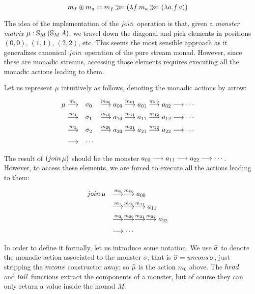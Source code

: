$$
m_f\circledast m_a = m_f \mathbin{\gg\!\!=} (\lambda f. m_a \mathbin{\gg\!\!=} (\lambda a. f\,a))
$$

The idea of the implementation of the $\join$ operation is that,
given a {\em monster matrix} $\mu:\mathbb{S}_{M}\,(\mathbb{S}_{M}\,A)$, we travel down the diagonal and pick elements in positions $(0,0)$, $(1,1)$, $(2,2)$, etc.
This seems the most sensible approach as it generalizes canonical $\join$ operation of the pure stream monad.
However, since these are monadic streams, accessing those elements requires executing all the monadic actions leading to them.

Let us represent $\mu$ intuitively as follows, denoting the monadic actions by arrow:

$$
\begin{array}[t]{rll}
\mu \stackrel{m_0}{\longrightarrow} 
 & \sigma_0 
 & \stackrel{m_{00}}{\longrightarrow} a_{00} \stackrel{m_{01}}{\longrightarrow} a_{01} \stackrel{m_{02}}{\longrightarrow} a_{02} \stackrel{}{\longrightarrow} \cdots\\[5pt]
\stackrel{m_1}{\longrightarrow} 
 & \sigma_1 
 & \stackrel{m_{10}}{\longrightarrow} a_{10} \stackrel{m_{11}}{\longrightarrow} a_{11} \stackrel{m_{12}}{\longrightarrow} a_{12} \stackrel{}{\longrightarrow} \cdots\\[5pt]
\stackrel{m_2}{\longrightarrow} 
 & \sigma_2
 & \stackrel{m_{20}}{\longrightarrow} a_{20} \stackrel{m_{21}}{\longrightarrow} a_{21} \stackrel{m_{22}}{\longrightarrow} a_{22} \stackrel{}{\longrightarrow} \cdots\\[5pt]
\stackrel{}{\longrightarrow} & \cdots
\end{array}
$$

The result of $(\join\,\mu)$ should be the monster $a_{00} \stackrel{}{\longrightarrow} a_{11}\stackrel{}{\longrightarrow} a_{22} \stackrel{}{\longrightarrow} \cdots$.
However, to access these elements, we are forced to execute all the actions leading to them:

$$
\begin{array}{ll}
\join\,\mu 
& \larrow{m_0}\larrow{m_{00}} a_{00}\\[5pt]
& \larrow{m_1}\larrow{m_{10}}\larrow{m_{11}} a_{11}\\[5pt]
& \larrow{m_2}\larrow{m_{20}}\larrow{m_{21}}\larrow{m_{22}} a_{22}\\[5pt]
& \larrow{} \cdots
\end{array}
$$

In order to define it formally, let us introduce some notation.
We use $\widehat{\sigma}$ to denote the monadic action associated to the monster $\sigma$, that is $ \unc{\sigma} = \uncons\,\sigma $, just stripping the $\mcons$ constructor away; so $\widehat{\mu}$ is the action $m_0$ above.
The $\head$ and $\tail$ functions extract the components of a monster, but of course they can only return a value inside the monad $M$.

